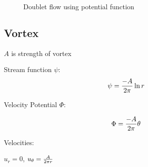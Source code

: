 \begin{figure}[h]
\begin{center}
\end{center}
\caption{Doublet flow using potential function}
\label{planardoubletflow}
\end{figure}


\subsection{Vortex}

$A$ is strength of vortex

Stream function $\psi$:
$$\psi = {-A \over 2\pi} \ln r$$

Velocity Potential $\Phi$:

$$\Phi = {-A \over 2 \pi} \theta $$

Velocities:

$u_r =0$, $u_\theta={A \over 2 \pi r}$

